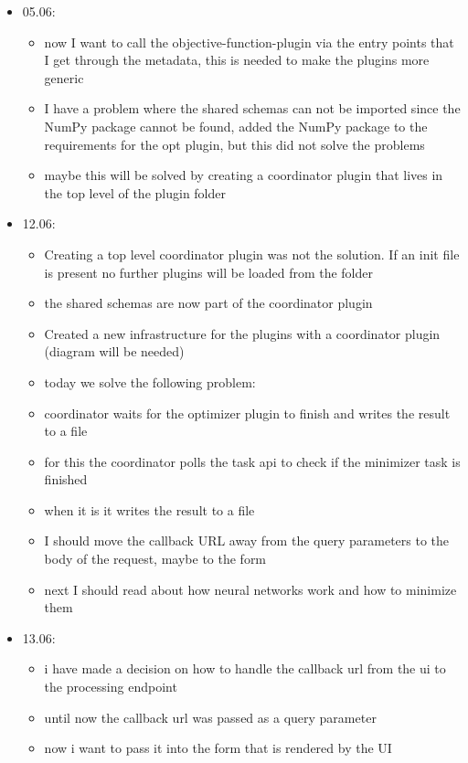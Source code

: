 \documentclass[
  a4paper,  %
  twoside,  %
  bibliography=totoc,
  headsepline,
  cleardoublepage=empty,
  parskip=half,
  draft=false
]{scrbook}
\begin{document}
\begin{itemize}
\begin{itemize}
  \end{itemize}
  \item 05.06:
  \begin{itemize}
    \item now I want to call the objective-function-plugin via the entry points that I get through the metadata, this is needed to make the plugins more generic
    \item I have a problem where the shared schemas can not be imported since the NumPy package cannot be found, added the NumPy package to the requirements for the opt plugin, but this did not solve the problems
    \item maybe this will be solved by creating a coordinator plugin that lives in the top level of the plugin folder
  \end{itemize}
  \item 12.06:
  \begin{itemize}
    \item Creating a top level coordinator plugin was not the solution. If an init file is present no further plugins will be loaded from the folder
    \item the shared schemas are now part of the coordinator plugin
    \item Created a new infrastructure for the plugins with a coordinator plugin (diagram will be needed)
    \item today we solve the following problem:
    \item coordinator waits for the optimizer plugin to finish and writes the result to a file
    \item for this the coordinator polls the task api to check if the minimizer task is finished
    \item when it is it writes the result to a file
    \item I should move the callback URL away from the query parameters to the body of the request, maybe to the form
    \item next I should read about how neural networks work and how to minimize them
  \end{itemize}
  \item 13.06:
  \begin{itemize}
    \item i have made a decision on how to handle the callback url from the ui to the processing endpoint
    \item until now the callback url was passed as a query parameter
    \item now i want to pass it into the form that is rendered by the UI

\end{itemize}
\end{itemize}
\end{document}
